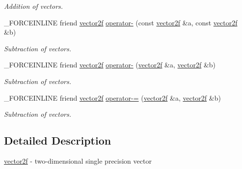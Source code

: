 \begin{DoxyCompactItemize}
\begin{DoxyCompactList}\small\item\em Addition of vectors. \end{DoxyCompactList}\item 
\hypertarget{classbt_1_1vector2f_a39972b9fb53efbed14b59686cbf61709}{\-\_\-\-F\-O\-R\-C\-E\-I\-N\-L\-I\-N\-E friend \hyperlink{classbt_1_1vector2f}{vector2f} \hyperlink{classbt_1_1vector2f_a39972b9fb53efbed14b59686cbf61709}{operator-\/} (const \hyperlink{classbt_1_1vector2f}{vector2f} \&a, const \hyperlink{classbt_1_1vector2f}{vector2f} \&b)}\label{classbt_1_1vector2f_a39972b9fb53efbed14b59686cbf61709}

\begin{DoxyCompactList}\small\item\em Subtraction of vectors. \end{DoxyCompactList}\item 
\hypertarget{classbt_1_1vector2f_abfbdb076513f13657ee4a3a54189786a}{\-\_\-\-F\-O\-R\-C\-E\-I\-N\-L\-I\-N\-E friend \hyperlink{classbt_1_1vector2f}{vector2f} \hyperlink{classbt_1_1vector2f_abfbdb076513f13657ee4a3a54189786a}{operator-\/} (\hyperlink{classbt_1_1vector2f}{vector2f} \&a, \hyperlink{classbt_1_1vector2f}{vector2f} \&b)}\label{classbt_1_1vector2f_abfbdb076513f13657ee4a3a54189786a}

\begin{DoxyCompactList}\small\item\em Subtraction of vectors. \end{DoxyCompactList}\item 
\hypertarget{classbt_1_1vector2f_a011c8094e191ffdbf6a539f06533d80c}{\-\_\-\-F\-O\-R\-C\-E\-I\-N\-L\-I\-N\-E friend \hyperlink{classbt_1_1vector2f}{vector2f} \hyperlink{classbt_1_1vector2f_a011c8094e191ffdbf6a539f06533d80c}{operator-\/=} (\hyperlink{classbt_1_1vector2f}{vector2f} \&a, \hyperlink{classbt_1_1vector2f}{vector2f} \&b)}\label{classbt_1_1vector2f_a011c8094e191ffdbf6a539f06533d80c}

\begin{DoxyCompactList}\small\item\em Subtraction of vectors. \end{DoxyCompactList}\end{DoxyCompactItemize}


\subsection{Detailed Description}
\hyperlink{classbt_1_1vector2f}{vector2f} -\/ two-\/dimensional single precision vector 

